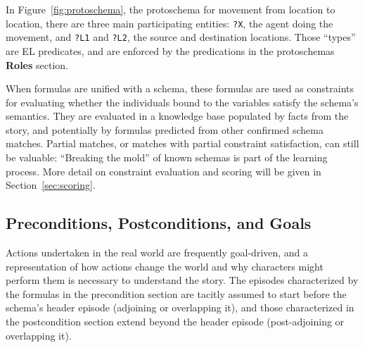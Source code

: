 In Figure~\ref{fig:protoschema}, the protoschema for movement from location to location, there are three main participating entities: \texttt{?X}, the agent doing the movement, and \texttt{?L1} and \texttt{?L2}, the source and destination locations. Those ``types'' are EL predicates, and are enforced by the predications in the protoschemas \textbf{Roles} section.

When formulas are unified with a schema, these formulas are used as constraints for evaluating whether the individuals bound to the variables satisfy the schema's semantics. They are evaluated in a knowledge base populated by facts from the story, and potentially by formulas predicted from other confirmed schema matches. Partial matches, or matches with partial constraint satisfaction, can still be valuable: ``Breaking the mold'' of known schemas is part of the learning process. More detail on constraint evaluation and scoring will be given in Section~\ref{sec:scoring}.

\subsection{Preconditions, Postconditions, and Goals}
Actions undertaken in the real world are frequently goal-driven, and a representation of how actions change the world and why characters might perform them is necessary to understand the story. The episodes characterized by the formulas in the precondition section are tacitly assumed to start before the schema's header episode (adjoining or overlapping it), and those characterized in the postcondition section extend beyond the header episode (post-adjoining or overlapping it).

